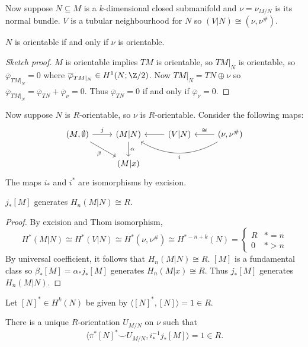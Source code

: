 \documentclass[a4paper]{article}
\newcommand*{\cp}{\smile} %
\begin{document}
Now suppose \(N \subseteq M\) is a \(k\)-dimensional closed submanifold and \(\nu = \nu_{M/N}\) is its normal bundle. \(V\) is a tubular neighbourhood for \(N\) so \((V|N) \cong (\nu, \nu^\#)\).

\begin{lemma}
  \(N\) is orientable if and only if \(\nu\) is orientable.
\end{lemma}

\begin{proof}[Sketch proof]
  \(M\) is orientable implies \(TM\) is orientable, so \(TM|_N\) is orientable, so \(\overline \varphi_{TM|_N} = 0\) where \(\overline \varphi_{TM|_N} \in H^1(N; \Z/2)\). Now \(TM|_N = TN \oplus \nu\) so \(\overline \varphi_{TM|_N} = \overline \varphi_{TN} + \overline \varphi_\nu = 0\). Thus \(\overline \varphi_{TN} = 0\) if and only if \(\overline \varphi_\nu = 0\).
\end{proof}

Now suppose \(N\) is \(R\)-orientable, so \(\nu\) is \(R\)-orientable. Consider the following maps:
\[
  \begin{tikzcd}
    (M, \emptyset) \ar[r, "j"] \ar[dr, "\beta"'] & (M|N) \ar[d, "\alpha"] & (V|N) \ar[l] & (\nu, \nu^\#) \ar[l, "\cong"'] \ar[ll, bend left, "i"] \\
    & (M|x)
  \end{tikzcd}
\]
The maps \(i_*\) and \(i^*\) are isomorphisms by excision.

\begin{lemma}
  \(j_*[M]\) generates \(H_n(M|N) \cong R\).
\end{lemma}

\begin{proof}
  By excision and Thom isomorphism,
  \[
    H^*(M|N) \cong H^*(V|N) \cong H^*(\nu, \nu^\#) \cong H^{* - n + k}(N) =
    \begin{cases}
      R & * = n \\
      0 & * > n
    \end{cases}
  \]
  By universal coefficient, it follows that \(H_n(M|N) \cong R\). \([M]\) is a fundamental class so \(\beta_*[M] = \alpha_* j_*[M]\) generates \(H_n(M|x) \cong R\). Thus \(j_*[M]\) generates \(H_n(M|N)\).
\end{proof}

Let \([N]^* \in H^k(N)\) be given by \(\langle [N]^*, [N] \rangle = 1 \in R\).

\begin{corollary}
  There is a unique \(R\)-orientation \(U_{M/N}\) on \(\nu\) such that
  \[
    \langle \pi^*[N]^* \cp U_{M/N}, i_*^{-1} j_*[M] \rangle = 1 \in R.
  \]
\end{corollary}
\end{document}
